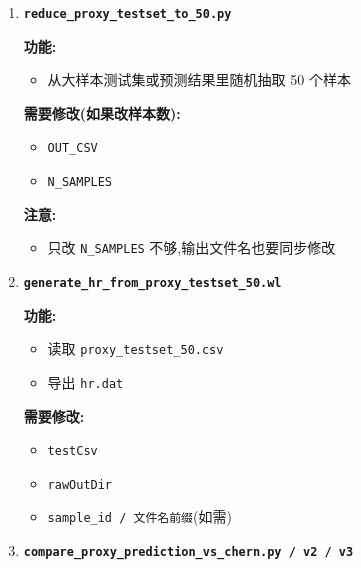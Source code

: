 \documentclass[lang=cn,scheme=chinese,color=blue,device=normal,toc=onecol,math=cm]{elegantbook}
\begin{document}
\begin{enumerate}
\item \textbf{\texttt{reduce\_\allowbreak{}proxy\_\allowbreak{}testset\_\allowbreak{}to\_\allowbreak{}50.py}}\par
 
\textbf{功能:}\par
 
\begin{itemize}
\item 从大样本测试集或预测结果里随机抽取 50 个样本
\end{itemize}
 
\textbf{需要修改(如果改样本数):}\par
 
\begin{itemize}
\item \texttt{OUT\_\allowbreak{}CSV}
\item \texttt{N\_\allowbreak{}SAMPLES}
\end{itemize}
 
\textbf{注意:}\par
 
\begin{itemize}
\item 只改 \texttt{N\_\allowbreak{}SAMPLES} 不够,输出文件名也要同步修改
\end{itemize}
\item \textbf{\texttt{generate\_\allowbreak{}hr\_\allowbreak{}from\_\allowbreak{}proxy\_\allowbreak{}testset\_\allowbreak{}50.wl}}\par
 
\textbf{功能:}\par
 
\begin{itemize}
\item 读取 \texttt{proxy\_\allowbreak{}testset\_\allowbreak{}50.csv}
\item 导出 \texttt{hr.dat}
\end{itemize}
 
\textbf{需要修改:}\par
 
\begin{itemize}
\item \texttt{testCsv}
\item \texttt{rawOutDir}
\item \texttt{sample\_\allowbreak{}id /\allowbreak{} 文件名前缀}(如需)
\end{itemize}
\item \textbf{\texttt{compare\_\allowbreak{}proxy\_\allowbreak{}prediction\_\allowbreak{}vs\_\allowbreak{}chern.py /\allowbreak{} v2 /\allowbreak{} v3}}\par
 

\end{enumerate}
\end{document}
